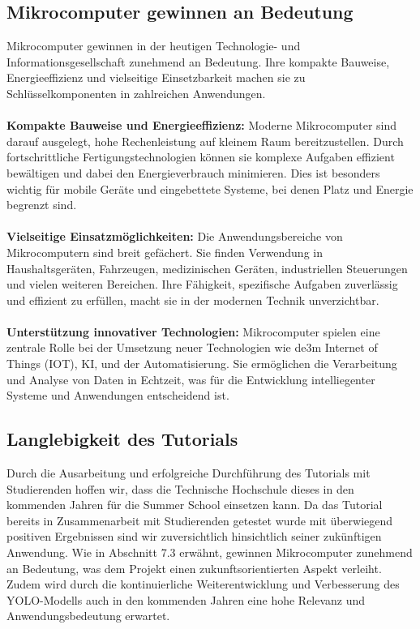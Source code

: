 \subsection{Mikrocomputer gewinnen an Bedeutung}
Mikrocomputer gewinnen in der heutigen Technologie- und Informationsgesellschaft zunehmend an Bedeutung. Ihre kompakte Bauweise, Energieeffizienz und vielseitige Einsetzbarkeit machen sie zu Schlüsselkomponenten in zahlreichen Anwendungen.\\\\
\textbf{Kompakte Bauweise und Energieeffizienz:} Moderne Mikrocomputer sind darauf ausgelegt, hohe Rechenleistung auf kleinem Raum bereitzustellen. Durch fortschrittliche Fertigungstechnologien können sie komplexe Aufgaben effizient bewältigen und dabei den Energieverbrauch minimieren. Dies ist besonders wichtig für mobile Geräte und eingebettete Systeme, bei denen Platz und Energie begrenzt sind.\\\\
\textbf{Vielseitige Einsatzmöglichkeiten:} Die Anwendungsbereiche von Mikrocomputern sind breit gefächert. Sie finden Verwendung in Haushaltsgeräten, Fahrzeugen, medizinischen Geräten, industriellen Steuerungen und vielen weiteren Bereichen. Ihre Fähigkeit, spezifische Aufgaben zuverlässig und effizient zu erfüllen, macht sie in der modernen Technik unverzichtbar.\\\\
\textbf{Unterstützung innovativer Technologien:} Mikrocomputer spielen eine zentrale Rolle bei der Umsetzung neuer Technologien wie de3m Internet of Things (IOT), KI, und der Automatisierung. Sie ermöglichen die Verarbeitung und Analyse von Daten in Echtzeit, was für die Entwicklung intelliegenter Systeme und Anwendungen entscheidend ist.

\subsection{Langlebigkeit des Tutorials}
Durch die Ausarbeitung und erfolgreiche Durchführung des Tutorials mit Studierenden hoffen wir, dass die Technische Hochschule dieses in den kommenden Jahren für die Summer School einsetzen kann. Da das Tutorial bereits in Zusammenarbeit mit Studierenden getestet wurde mit überwiegend positiven Ergebnissen sind wir zuversichtlich hinsichtlich seiner zukünftigen Anwendung. Wie in Abschnitt 7.3 erwähnt, gewinnen Mikrocomputer zunehmend an Bedeutung, was dem Projekt einen zukunftsorientierten Aspekt verleiht. Zudem wird durch die kontinuierliche Weiterentwicklung und Verbesserung des YOLO-Modells auch in den kommenden Jahren eine hohe Relevanz und Anwendungsbedeutung erwartet.

